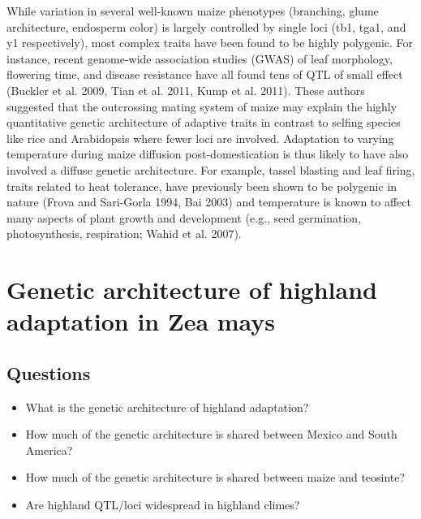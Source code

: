 While variation in several well-known maize phenotypes (branching, glume architecture, endosperm color) is largely controlled by single loci (tb1, tga1, and y1 respectively), most complex traits have been found to be highly polygenic.  For instance, recent genome-wide association studies (GWAS) of leaf morphology, flowering time, and disease resistance have all found tens of QTL of small effect (Buckler et al. 2009, Tian et al. 2011, Kump et al. 2011).  These authors suggested that the outcrossing mating system of maize may explain the highly quantitative genetic architecture of adaptive traits in contrast to selfing species like rice and Arabidopsis where fewer loci are involved.  Adaptation to varying temperature during maize diffusion post-domestication is thus likely to have also involved a diffuse genetic architecture.  For example, tassel blasting and leaf firing, traits related to heat tolerance, have previously been shown to be polygenic in nature (Frova and Sari-Gorla 1994, Bai 2003) and temperature is known to affect many aspects of plant growth and development (e.g., seed germination, photosynthesis, respiration; Wahid et al. 2007).  

\section{Genetic architecture of highland adaptation in Zea mays}

\subsection{Questions}
\begin{itemize}
\item What is the genetic architecture of highland adaptation?
\item How much of the genetic architecture is shared between Mexico and South America?
\item How much of the genetic architecture is shared between maize and teosinte?
\item Are highland QTL/loci widespread in highland climes?
\end{itemize}

